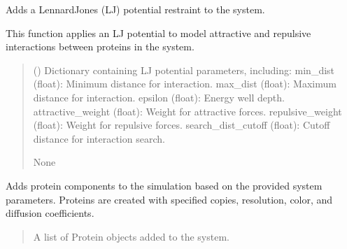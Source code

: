 \documentclass[letterpaper,10pt,english]{sphinxmanual}
\begin{document}
\begin{fulllineitems}
\begin{fulllineitems}
\label{\detokenize{src:src.System_Class.System.add_LJ_potential_restraint}}
\pysigstartsignatures
{}
\pysigstopsignatures
\sphinxAtStartPar
Adds a Lennard\sphinxhyphen{}Jones (LJ) potential restraint to the system.

\sphinxAtStartPar
This function applies an LJ potential to model attractive and repulsive interactions
between proteins in the system.
\begin{quote}\begin{description}
\sphinxAtStartPar
{} () \textendash{} Dictionary containing LJ potential parameters, including:
\sphinxhyphen{} min\_dist (float): Minimum distance for interaction.
\sphinxhyphen{} max\_dist (float): Maximum distance for interaction.
\sphinxhyphen{} epsilon (float): Energy well depth.
\sphinxhyphen{} attractive\_weight (float): Weight for attractive forces.
\sphinxhyphen{} repulsive\_weight (float): Weight for repulsive forces.
\sphinxhyphen{} search\_dist\_cutoff (float): Cutoff distance for interaction search.

\sphinxAtStartPar
None

\end{description}\end{quote}

\end{fulllineitems}


\begin{fulllineitems}
\label{\detokenize{src:src.System_Class.System.add_components}}
\pysigstartsignatures
{}
\pysigstopsignatures
\sphinxAtStartPar
Adds protein components to the simulation based on the provided system parameters.
Proteins are created with specified copies, resolution, color, and diffusion coefficients.
\begin{quote}\begin{description}
\sphinxAtStartPar
{}

\sphinxAtStartPar
A list of Protein objects added to the system.


\end{description}
\end{quote}
\end{fulllineitems}
\end{fulllineitems}
\end{document}
